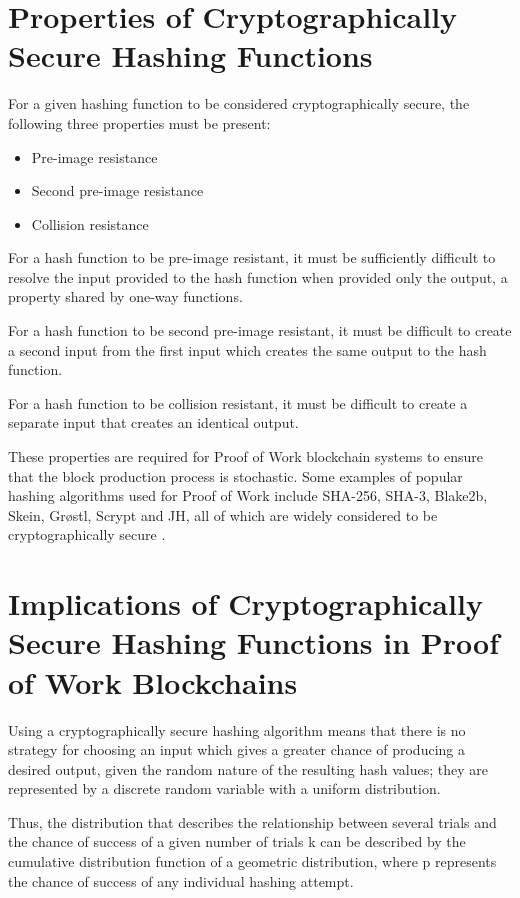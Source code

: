 \documentclass[]{article}
\begin{document}
\section{Properties of Cryptographically Secure Hashing Functions}
For a given hashing function to be considered cryptographically secure, the following three properties must be present: 
\begin{itemize}
	\item Pre-image resistance
	\item Second pre-image resistance
	\item Collision resistance
\end{itemize}

For a hash function to be pre-image resistant, it must be sufficiently difficult to resolve the input provided to the hash function when provided only the output, a property shared by one-way functions.   
\newline 

For a hash function to be second pre-image resistant, it must be difficult to create a second input from the first input which creates the same output to the hash function. 
\newline

For a hash function to be collision resistant, it must be difficult to create a separate input that creates an identical output. 
\newline

These properties are required for Proof of Work blockchain systems to ensure that the block production process is stochastic.  Some examples of popular hashing algorithms used for Proof of Work include SHA-256, SHA-3, Blake2b, Skein, Grøstl, Scrypt and JH, all of which are widely considered to be cryptographically secure \cite{CryptoAlgos}. 

\section{Implications of Cryptographically Secure Hashing Functions in Proof of Work Blockchains}
Using a cryptographically secure hashing algorithm means that there is no strategy for choosing an input which gives a greater chance of producing a desired output, given the random nature of the resulting hash values; they are represented by a discrete random variable with a uniform distribution.  
\newline

Thus, the distribution that describes the relationship between several trials and the chance of success of a given number of trials k can be described by the cumulative distribution function of a geometric distribution, where p represents the chance of success of any individual hashing attempt.   
\end{document}
